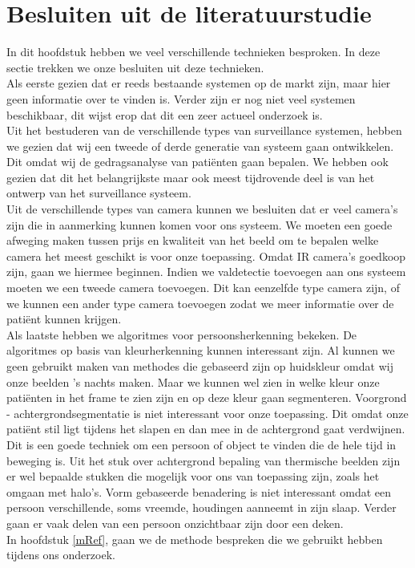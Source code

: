 \section{Besluiten uit de literatuurstudie}
\label{refLBe}
In dit hoofdstuk hebben we veel verschillende technieken besproken. In deze sectie trekken we onze besluiten uit deze technieken. \\
Als eerste gezien dat er reeds bestaande systemen op de markt zijn, maar hier geen informatie over te vinden is. Verder zijn er nog niet veel systemen beschikbaar, dit wijst erop dat dit een zeer actueel onderzoek is. \\
Uit het bestuderen van de verschillende types van surveillance systemen, hebben we gezien dat wij een tweede of derde generatie van systeem gaan ontwikkelen. Dit omdat wij de gedragsanalyse van pati\"enten gaan bepalen. We hebben ook gezien dat dit het belangrijkste maar ook meest tijdrovende deel is van het ontwerp van het surveillance systeem. \\
Uit de verschillende types van camera kunnen we besluiten dat er veel camera's zijn die in aanmerking kunnen komen voor ons systeem. We moeten een goede afweging maken tussen prijs en kwaliteit van het beeld om te bepalen welke camera het meest geschikt is voor onze toepassing. Omdat IR camera's goedkoop zijn, gaan we hiermee beginnen. Indien we valdetectie toevoegen aan ons systeem moeten we een tweede camera toevoegen. Dit kan eenzelfde type camera zijn, of we kunnen een ander type camera toevoegen zodat we meer informatie over de pati\"ent kunnen krijgen.\\
Als laatste hebben we algoritmes voor persoonsherkenning bekeken. De algoritmes op basis van kleurherkenning kunnen interessant zijn. Al kunnen we geen gebruikt maken van methodes die gebaseerd zijn op huidskleur omdat wij onze beelden 's nachts maken. Maar we kunnen wel zien in welke kleur onze pati\"enten in het frame te zien zijn en op deze kleur gaan segmenteren. Voorgrond - achtergrondsegmentatie is niet interessant voor onze toepassing. Dit omdat onze pati\"ent stil ligt tijdens het slapen en dan mee in de achtergrond gaat verdwijnen. Dit is een goede techniek om een persoon of object te vinden die de hele tijd in beweging is. Uit het stuk over achtergrond bepaling van thermische beelden zijn er wel bepaalde stukken die mogelijk voor ons van toepassing zijn, zoals het omgaan met halo's. Vorm gebaseerde benadering is niet interessant omdat een persoon verschillende, soms vreemde, houdingen aanneemt in zijn slaap. Verder gaan er vaak delen van een persoon onzichtbaar zijn door een deken.\\
In hoofdstuk \ref{mRef}, gaan we de methode bespreken die we gebruikt hebben tijdens ons onderzoek.